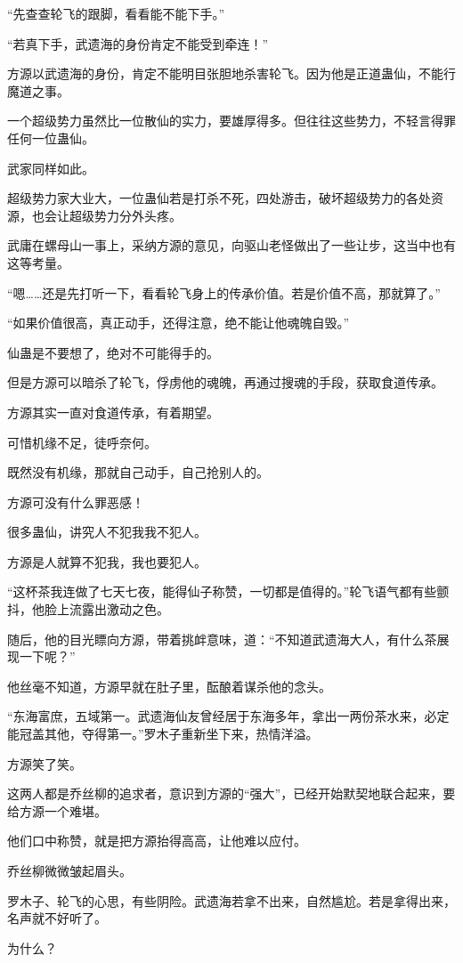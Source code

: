\begin{this_body}
“先查查轮飞的跟脚，看看能不能下手。”

“若真下手，武遗海的身份肯定不能受到牵连！”

方源以武遗海的身份，肯定不能明目张胆地杀害轮飞。因为他是正道蛊仙，不能行魔道之事。

一个超级势力虽然比一位散仙的实力，要雄厚得多。但往往这些势力，不轻言得罪任何一位蛊仙。

武家同样如此。

超级势力家大业大，一位蛊仙若是打杀不死，四处游击，破坏超级势力的各处资源，也会让超级势力分外头疼。

武庸在螺母山一事上，采纳方源的意见，向驱山老怪做出了一些让步，这当中也有这等考量。

“嗯……还是先打听一下，看看轮飞身上的传承价值。若是价值不高，那就算了。”

“如果价值很高，真正动手，还得注意，绝不能让他魂魄自毁。”

仙蛊是不要想了，绝对不可能得手的。

但是方源可以暗杀了轮飞，俘虏他的魂魄，再通过搜魂的手段，获取食道传承。

方源其实一直对食道传承，有着期望。

可惜机缘不足，徒呼奈何。

既然没有机缘，那就自己动手，自己抢别人的。

方源可没有什么罪恶感！

很多蛊仙，讲究人不犯我我不犯人。

方源是人就算不犯我，我也要犯人。

“这杯茶我连做了七天七夜，能得仙子称赞，一切都是值得的。”轮飞语气都有些颤抖，他脸上流露出激动之色。

随后，他的目光瞟向方源，带着挑衅意味，道：“不知道武遗海大人，有什么茶展现一下呢？”

他丝毫不知道，方源早就在肚子里，酝酿着谋杀他的念头。

“东海富庶，五域第一。武遗海仙友曾经居于东海多年，拿出一两份茶水来，必定能冠盖其他，夺得第一。”罗木子重新坐下来，热情洋溢。

方源笑了笑。

这两人都是乔丝柳的追求者，意识到方源的“强大”，已经开始默契地联合起来，要给方源一个难堪。

他们口中称赞，就是把方源抬得高高，让他难以应付。

乔丝柳微微皱起眉头。

罗木子、轮飞的心思，有些阴险。武遗海若拿不出来，自然尴尬。若是拿得出来，名声就不好听了。

为什么？


\end{this_body}
